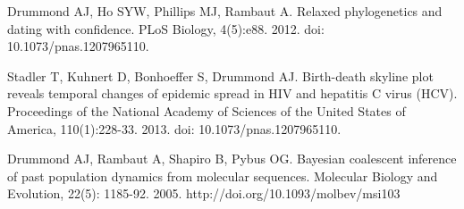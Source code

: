 \documentclass[10pt,letterpaper]{article}
\begin{document}
\begin{thebibliography}{10}
Drummond AJ, Ho SYW, Phillips MJ, Rambaut A.
\newblock Relaxed phylogenetics and dating with confidence.
\newblock PLoS Biology, 4(5):e88. 2012. doi: 10.1073/pnas.1207965110.

Stadler T, Kuhnert D, Bonhoeffer S, Drummond AJ.
\newblock Birth-death skyline plot reveals temporal changes of epidemic spread in HIV and hepatitis C virus (HCV).
\newblock Proceedings of the National Academy of Sciences of the United States of America, 110(1):228-33. 2013. doi: 10.1073/pnas.1207965110.

Drummond AJ, Rambaut A, Shapiro B, Pybus OG.
\newblock Bayesian coalescent inference of past population dynamics from molecular sequences.
\newblock Molecular Biology and Evolution, 22(5): 1185-92. 2005. http://doi.org/10.1093/molbev/msi103

\end{thebibliography}
\end{document}
